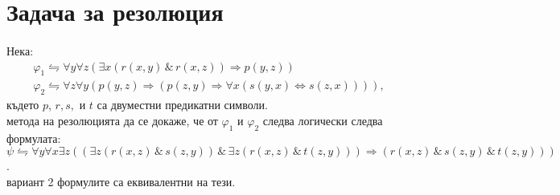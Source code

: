 \documentclass[12pt]{article}
\def\Land{\,\&\,}
\begin{document}
\vskip 0.2in


\newpage
\section{Задача за резолюция}
\paragraph{}
Нека:
\begin{gather*}
\varphi_{1}\leftrightharpoons\forall y \forall z(\exists x(r(x, y)\Land r(x, z)) \Rightarrow p(y, z))\\
\varphi_{2}\leftrightharpoons\forall z \forall y(p(y, z) \Rightarrow(p(z, y) \Rightarrow \forall x(s(y, x) \Leftrightarrow s(z, x)))),
\end{gather*} 
\indent където $p$, $r, s,$ и $t$ са двуместни предикатни символи. \\  метода на резолюцията да  се докаже, че от $\varphi_1$ и $\varphi_2$ следва логически следва формулата:\\
$\psi \leftrightharpoons \forall y \forall x \exists z((\exists z(r(x, z)\Land s(z, y))\Land \exists z(r(x, z)\Land t(z, y))) \Rightarrow (r(x, z)\Land s(z, y)\Land t(z, y)))$.\\
 вариант 2 формулите са еквивалентни на тези.
\end{document}
